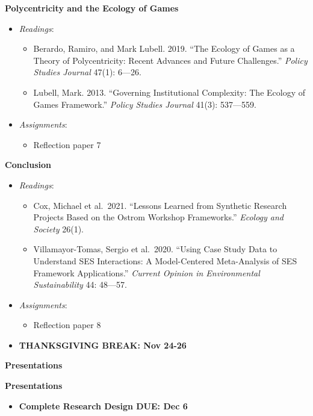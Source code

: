 \week \textbf{Polycentricity and the Ecology of Games}

\begin{itemize}

\item
  \emph{Readings}:

  \begin{itemize}
  
  \item
    Berardo, Ramiro, and Mark Lubell. 2019. ``The Ecology of Games as a
    Theory of Polycentricity: Recent Advances and Future Challenges.''
    \emph{Policy Studies Journal} 47(1): 6---26.
  \item
    Lubell, Mark. 2013. ``Governing Institutional Complexity: The
    Ecology of Games Framework.'' \emph{Policy Studies Journal} 41(3):
    537---559.
  \end{itemize}
\item
  \emph{Assignments}:

  \begin{itemize}
  
  \item
    Reflection paper 7
  \end{itemize}
\end{itemize}

\week \textbf{Conclusion}

\begin{itemize}

\item
  \emph{Readings}:

  \begin{itemize}
  
  \item
    Cox, Michael et al.~2021. ``Lessons Learned from Synthetic Research
    Projects Based on the Ostrom Workshop Frameworks.'' \emph{Ecology
    and Society} 26(1).
  \item
    Villamayor-Tomas, Sergio et al.~2020. ``Using Case Study Data to
    Understand SES Interactions: A Model-Centered Meta-Analysis of SES
    Framework Applications.'' \emph{Current Opinion in Environmental
    Sustainability} 44: 48---57.
  \end{itemize}
\item
  \emph{Assignments}:

  \begin{itemize}
  
  \item
    Reflection paper 8
  \end{itemize}
\item
  \textbf{THANKSGIVING BREAK: Nov 24-26}
\end{itemize}

\week \textbf{Presentations}

\week \textbf{Presentations}

\begin{itemize}

\item
  \textbf{Complete Research Design DUE: Dec 6}
\end{itemize}
